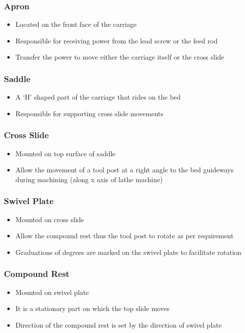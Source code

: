 \documentclass{article}
\begin{document}
\subsubsection*{Apron}
\begin{itemize}
  \item Located on the front face of the carriage 
  \item Responsible for receiving power from the lead screw or the feed rod
  \item Transfer the power to move either the carriage itself or the cross slide
\end{itemize}

\subsubsection*{Saddle}
\begin{itemize}
  \item A ‘H’ shaped part of the carriage that rides on 
  the bed
  \item Responsible for supporting cross slide 
  movements
\end{itemize}

\subsubsection*{Cross Slide}
\begin{itemize}
  \item Mounted on top surface of saddle
  \item Allow the movement of a tool post at a right angle to the bed guideways during machining (along x axis of lathe machine)
\end{itemize}

\subsubsection*{Swivel Plate}
\begin{itemize}
  \item Mounted on cross slide
  \item Allow the compound rest thus the tool post to rotate as per requirement
  \item Graduations of degrees are marked on the swivel plate to facilitate rotation
\end{itemize}

\subsubsection*{Compound Rest}
\begin{itemize}
  \item Mounted on swivel plate
  \item It is a stationary part on which the top slide moves
  \item Direction of the compound rest is set by the direction of swivel plate
\end{itemize}
\end{document}
